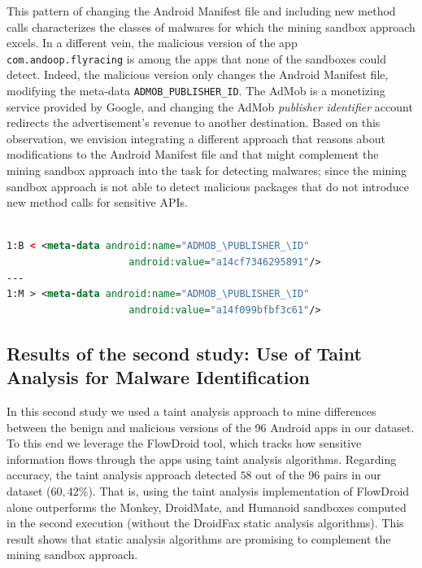 This pattern of changing the Android Manifest file and including
new method calls characterizes the classes of malwares for which
the mining sandbox approach excels. 
In a different vein, the malicious version of the app
\texttt{com.andoop.flyracing} is among the apps that none of the sandboxes could
detect. Indeed, the malicious version only changes the Android Manifest file,
modifying the meta-data \texttt{ADMOB\_PUBLISHER\_ID}. The AdMob is a monetizing
service provided by Google, and changing the AdMob \emph{publisher identifier} account redirects
the advertisement's revenue to another destination. Based on
this observation, we envision integrating a different approach that reasons
about modifications to the Android Manifest file and that might complement the mining sandbox
approach into the task for detecting malwares; since the mining
sandbox approach is not able to detect malicious packages that
do not introduce new method calls for sensitive APIs.

\begin{lstlisting}[caption={Diff in the file \texttt{com.andoop.flyracing}
      AndroidManifest file of the malicious version.
      \texttt{B} stands for
      the benign version, while \texttt{M} stands for the malicious version.}, language=XML,
    basicstyle=\fontsize{8}{6}\selectfont\ttfamily,label={lst:app65b}]

1:B < <meta-data android:name="ADMOB_\PUBLISHER_\ID"
                     android:value="a14cf7346295891"/>
---
1:M > <meta-data android:name="ADMOB_\PUBLISHER_\ID"
                     android:value="a14f099bfbf3c61"/>
\end{lstlisting}


\subsection{Results of the second study: Use of Taint Analysis for Malware Identification}\label{sec:res-ss}

In this second study we used a taint analysis approach to mine differences between the
benign and malicious versions of the 96 Android apps in our dataset. To this end we leverage the FlowDroid
tool, which tracks how sensitive information flows through the apps using taint analysis algorithms.
Regarding accuracy, the taint analysis approach detected $58$ out of the $96$ pairs in our dataset ($60,42$\%). That is,
using the taint analysis implementation of FlowDroid alone outperforms the Monkey, DroidMate,
and Humanoid sandboxes computed in the second execution (without the DroidFax static analysis
algorithms). This result shows that static analysis algorithms are promising to complement
the mining sandbox approach.

